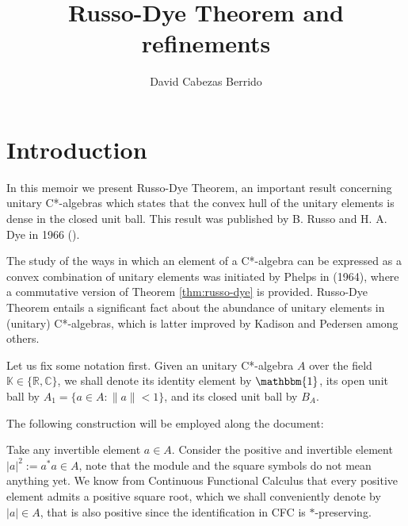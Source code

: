 \documentclass[12pt,english]{article}
\title{Russo-Dye Theorem and refinements}
\author{David Cabezas Berrido}
\date{}
\theoremstyle{definition}
\theoremstyle{remark}
\begin{document}
\maketitle

\section*{Introduction}

In this memoir we present Russo-Dye Theorem, an important result concerning unitary C*-algebras which states that the convex hull of the unitary elements is dense in the closed unit ball. This result was published by B. Russo and H. A. Dye in 1966 (\cite{russo-dye}).

The study of the ways in which an element of a C*-algebra can be expressed as a convex combination of unitary elements was initiated by Phelps in \cite{phelps} (1964), where a commutative version of Theorem \ref{thm:russo-dye} is provided. Russo-Dye Theorem entails a significant fact about the abundance of unitary elements in (unitary) C*-algebras, which is latter improved by Kadison and Pedersen among others.

Let us fix some notation first. Given an unitary C*-algebra $A$ over the field $\mathbb{K}\in\{\mathbb{R},\mathbb{C}\}$, we shall denote its identity element by $\mathbbm{1}$, its open unit ball by $A_1=\{a\in A: \|a\|<1\}$, and its closed unit ball by $B_A$.

The following construction will be employed along the document:

Take any invertible element $a\in A$. Consider the positive and invertible element $|a|^2:=a^*a\in A$, note that the module and the square symbols do not mean anything yet. We know from Continuous Functional Calculus that every positive element admits a positive square root, which we shall conveniently denote by $|a|\in A$, that is also positive since the identification in CFC is $*$-preserving.
\end{document}
